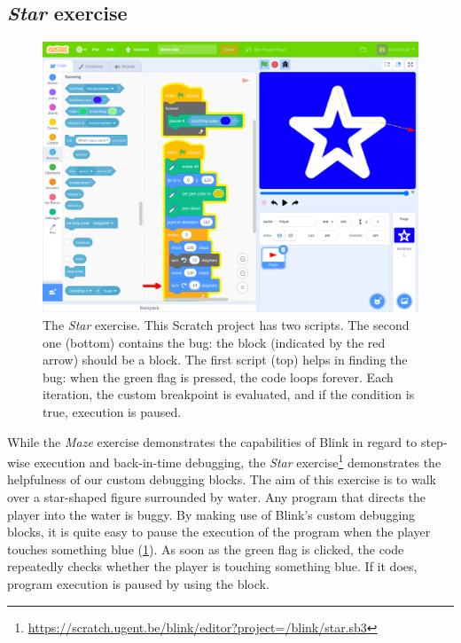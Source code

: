 \documentclass[../main]{subfiles}
\begin{document}
\subsection{\emph{Star} exercise}\label{subsec:star-exercise}

\begin{figure}
    \begin{wide}
        \includegraphics[width=\linewidth]{draw-star}
    \end{wide}
    \caption[The Star exercise.]{
        The \emph{Star} exercise.
        This Scratch project has two scripts.
        The second one (bottom) contains the bug: the  block (indicated by the red arrow) should be a  block.
        The first script (top) helps in finding the bug: when the green flag is pressed, the code loops forever.
        Each iteration, the custom breakpoint is evaluated, and if the condition is true, execution is paused.
    }
    \label{fig:star-exercise}
\end{figure}

While the \emph{Maze} exercise demonstrates the capabilities of Blink in regard to step-wise execution and back-in-time debugging, the \emph{Star} exercise\footnote{\url{https://scratch.ugent.be/blink/editor?project=/blink/star.sb3}} demonstrates the helpfulness of our custom debugging blocks.
The aim of this exercise is to walk over a star-shaped figure surrounded by water.
Any program that directs the player into the water is buggy.
By making use of Blink's custom debugging blocks, it is quite easy to pause the execution of the program when the player touches something blue (\cref{fig:star-exercise}).
As soon as the green flag is clicked, the code repeatedly checks whether the player is touching something blue.
If it does, program execution is paused by using the  block.
\end{document}
